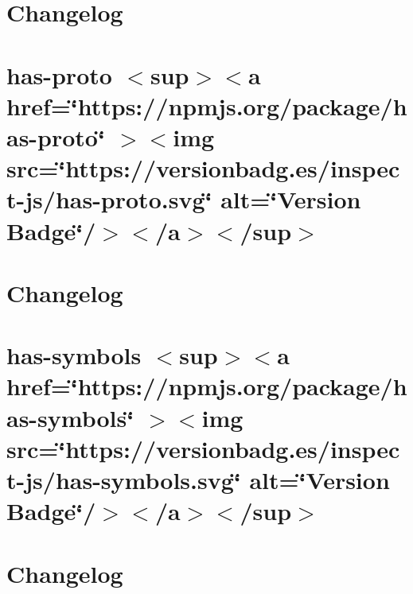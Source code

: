 \documentclass[twoside]{book}
\newcommand{\+}{\discretionary{\mbox{\scriptsize$\hookleftarrow$}}{}{}}
\begin{document}
\chapter{Changelog}
\label{md_src_nodejs_node_modules_has_proto_CHANGELOG}

\chapter{has-\/proto \texorpdfstring{$<$}{<}sup\texorpdfstring{$>$}{>}\texorpdfstring{$<$}{<}a href=\char`\"{}https\+://npmjs.\+org/package/has-\/proto\char`\"{} \texorpdfstring{$>$}{>}\texorpdfstring{$<$}{<}img src=\char`\"{}https\+://versionbadg.\+es/inspect-\/js/has-\/proto.\+svg\char`\"{} alt=\char`\"{}\+Version Badge\char`\"{}/\texorpdfstring{$>$}{>}\texorpdfstring{$<$}{<}/a\texorpdfstring{$>$}{>}\texorpdfstring{$<$}{<}/sup\texorpdfstring{$>$}{>}}
\label{md_src_nodejs_node_modules_has_proto_README}

\chapter{Changelog}
\label{md_src_nodejs_node_modules_has_symbols_CHANGELOG}

\chapter{has-\/symbols \texorpdfstring{$<$}{<}sup\texorpdfstring{$>$}{>}\texorpdfstring{$<$}{<}a href=\char`\"{}https\+://npmjs.\+org/package/has-\/symbols\char`\"{} \texorpdfstring{$>$}{>}\texorpdfstring{$<$}{<}img src=\char`\"{}https\+://versionbadg.\+es/inspect-\/js/has-\/symbols.\+svg\char`\"{} alt=\char`\"{}\+Version Badge\char`\"{}/\texorpdfstring{$>$}{>}\texorpdfstring{$<$}{<}/a\texorpdfstring{$>$}{>}\texorpdfstring{$<$}{<}/sup\texorpdfstring{$>$}{>}}
\label{md_src_nodejs_node_modules_has_symbols_README}

\chapter{Changelog}
\label{md_src_nodejs_node_modules_hasown_CHANGELOG}

\end{document}
